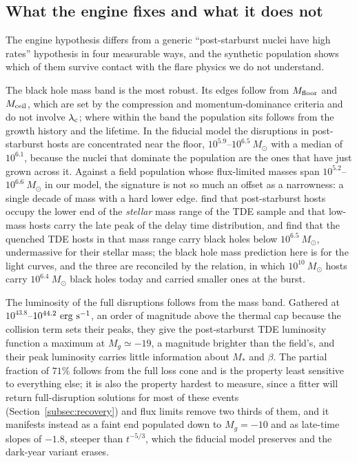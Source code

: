 \documentclass[twocolumn,pdftex]{aastex701}
\newcommand{\msun}{M_{\odot}\xspace}
\newcommand{\lamc}{\lambda_{\rm c}\xspace}
\begin{document}
\subsection{What the engine fixes and what it does not}\label{subsec:tests}

The engine hypothesis differs from a generic ``post-starburst nuclei have high rates'' hypothesis in four measurable ways, and the synthetic population shows which of them survive contact with the flare physics we do not understand.

The black hole mass band is the most robust. Its edges follow from $M_{\rm floor}$ and $M_{\rm ceil}$, which are set by the compression and momentum-dominance criteria and do not involve $\lamc$; where within the band the population sits follows from the growth history and the lifetime. In the fiducial model the disruptions in post-starburst hosts are concentrated near the floor, $10^{5.9}$--$10^{6.5}~\msun$ with a median of $10^{6.1}$, because the nuclei that dominate the population are the ones that have just grown across it. Against a field population whose flux-limited masses span $10^{5.2}$--$10^{6.6}~\msun$ in our model, the signature is not so much an offset as a narrowness: a single decade of mass with a hard lower edge. \citet{Shepherd:2026a} find that post-starburst hosts occupy the lower end of the {\it stellar} mass range of the TDE sample and that low-mass hosts carry the late peak of the delay time distribution, and \citet{Ramsden:2026a} find that the quenched TDE hosts in that mass range carry black holes below $10^{6.5}~\msun$, undermassive for their stellar mass; the black hole mass prediction here is for the light curves, and the three are reconciled by the \citet{Reines:2015a} relation, in which $10^{10}~\msun$ hosts carry $10^{6.4}~\msun$ black holes today and carried smaller ones at the burst.

The luminosity of the full disruptions follows from the mass band. Gathered at $10^{43.8}$--$10^{44.2}~{\rm erg~s^{-1}}$, an order of magnitude above the thermal cap because the collision term sets their peaks, they give the post-starburst TDE luminosity function a maximum at $M_g \simeq -19$, a magnitude brighter than the field's, and their peak luminosity carries little information about $M_\ast$ and $\beta$. The partial fraction of $71\%$ follows from the full loss cone and is the property least sensitive to everything else; it is also the property hardest to measure, since a fitter will return full-disruption solutions for most of these events (Section~\ref{subsec:recovery}) and flux limits remove two thirds of them, and it manifests instead as a faint end populated down to $M_g = -10$ and as late-time slopes of $-1.8$, steeper than $t^{-5/3}$, which the fiducial model preserves and the dark-year variant erases.
\end{document}
